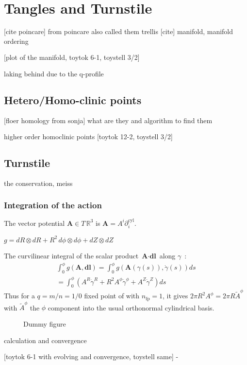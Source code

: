 \chapter{Tangles and Turnstile}

[cite poincare]
from poincare also called them trellis [cite]
manifold, manifold ordering 

[plot of the manifold, toytok 6-1, toystell 3/2]

laking behind due to the q-profile

\section{Hetero/Homo-clinic points}
[floer homology from sonja]
what are they and algorithm to find them

higher order homoclinic points
[toytok 12-2, toystell 3/2]

\section{Turnstile}

the conservation, meiss

\subsection{Integration of the action}

The vector potential $\textbf{A} \in T\,\mathbb{R}^3$ is $\textbf{A} =  A^i\partial_i^\text{cyl}$.

$g = dR\otimes dR + R^2\,d\phi\otimes d\phi + dZ\otimes dZ$

The curvilinear integral of the scalar product $\textbf{A}\cdot\textbf{dl}$ along $\gamma$~:
\begin{align*}
    \int_0^\phi g(\textbf{A},\textbf{dl}) = \int_0^\phi g(\textbf{A}(\gamma(s)),\dot{\gamma}(s))ds\\ = \int_0^\phi (A^R\dot{\gamma}^R + R^2A^\phi\dot{\gamma}^\phi + A^Z\dot{\gamma}^Z) ds
\end{align*}
Thus for a $q=m/n=1/0$ fixed point of with $n_\text{fp} = 1$, it gives $2\pi R^2A^\phi = 2\pi R\tilde{A}^\phi$ with $\tilde{A}^\phi$ the $\phi$ component into the usual orthonormal cylindrical basis.

\begin{figure}[!ht]
    \hfill
    \caption{Dummy figure}
    \label{fig:turnstile-area-sketches}
\end{figure}

calculation and convergence

[toytok 6-1 with evolving and convergence, toystell same]
-